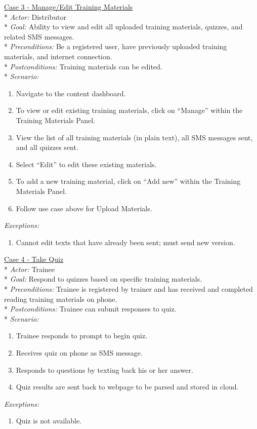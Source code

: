 \underline{Case 3 - Manage/Edit Training Materials}\\*
\textit{Actor:} Distributor\\*
\textit{Goal:} Ability to view and edit all uploaded training materials, quizzes, and related SMS messages.\\*
\textit{Preconditions:} Be a registered user, have previously uploaded training materials, and internet connection.\\*
\textit{Postconditions:} Training materials can be edited.\\*
\textit{Scenario:}
\begin{enumerate}
	\item{Navigate to the content dashboard.}
	\item{To view or edit existing training materials, click on “Manage” within the Training Materials Panel.}
	\item{View the list of all training materials (in plain text), all SMS messages sent, and all quizzes sent.}
	\item{Select “Edit” to edit these existing materials.}
	\item{To add a new training material, click on “Add new” within the Training Materials Panel.}
	\item{Follow use case above for Upload Materials.}
\end{enumerate}
\textit{Exceptions:}
\begin{enumerate}
	\item{Cannot edit texts that have already been sent; must send new version.}\\
\end{enumerate}

\underline{Case 4 - Take Quiz}\\*
\textit{Actor:} Trainee\\*
\textit{Goal:} Respond to quizzes based on specific training materials.\\*
\textit{Preconditions:} Trainee is registered by trainer and has received and completed reading training materials on phone.\\*
\textit{Postconditions:} Trainee can submit responses to quiz.\\*
\textit{Scenario:}
\begin{enumerate}
	\item{Trainee responds to prompt to begin quiz.}
	\item{Receives quiz on phone as SMS message.}
	\item{Responds to questions by texting back his or her answer.}
	\item{Quiz results are sent back to webpage to be parsed and stored in cloud.}
\end{enumerate}
\textit{Exceptions:}
\begin{enumerate}
	\item{Quiz is not available.}
\end{enumerate}


